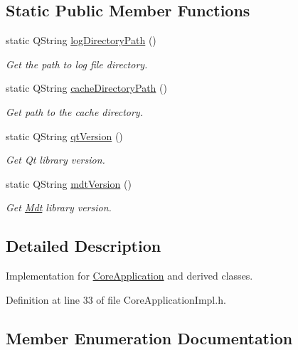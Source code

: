 \subsection*{Static Public Member Functions}
\begin{DoxyCompactItemize}
\item 
static Q\+String \hyperlink{class_mdt_1_1_core_application_impl_a5335fddfbe75c3944199d30d201ece04}{log\+Directory\+Path} ()
\begin{DoxyCompactList}\small\item\em Get the path to log file directory. \end{DoxyCompactList}\item 
static Q\+String \hyperlink{class_mdt_1_1_core_application_impl_a4d78244d773ca265a7108275f2295ca2}{cache\+Directory\+Path} ()
\begin{DoxyCompactList}\small\item\em Get path to the cache directory. \end{DoxyCompactList}\item 
static Q\+String \hyperlink{class_mdt_1_1_core_application_impl_a7c1f7ed8684b4d3ec8aa68a0da5d2d04}{qt\+Version} ()
\begin{DoxyCompactList}\small\item\em Get Qt library version. \end{DoxyCompactList}\item 
static Q\+String \hyperlink{class_mdt_1_1_core_application_impl_af8728d7751e6041d5680d99f033ae52d}{mdt\+Version} ()
\begin{DoxyCompactList}\small\item\em Get \hyperlink{namespace_mdt}{Mdt} library version. \end{DoxyCompactList}\end{DoxyCompactItemize}


\subsection{Detailed Description}
Implementation for \hyperlink{class_mdt_1_1_core_application}{Core\+Application} and derived classes. 

Definition at line 33 of file Core\+Application\+Impl.\+h.



\subsection{Member Enumeration Documentation}

